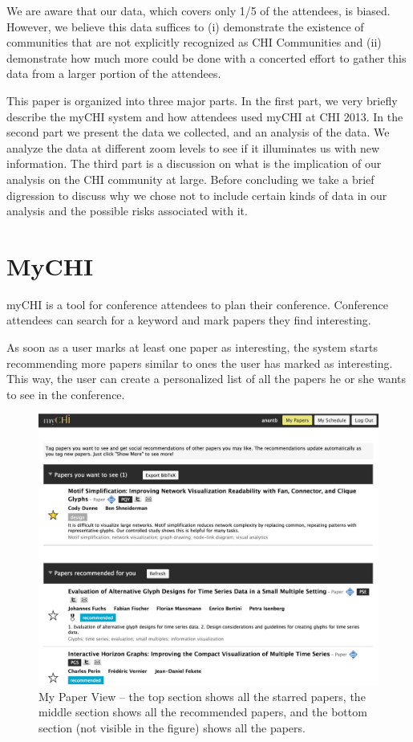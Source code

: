 \documentclass{sigchi}
\begin{document}
We are aware that our data, which covers only 1/5 of the attendees, is biased.  However, we believe this data suffices to (i) demonstrate the existence of communities that are not explicitly recognized as CHI Communities and (ii) demonstrate how much more could be done with a concerted effort to gather this data from a larger portion of the attendees.

This paper is organized into three major parts. In the first part, we very briefly describe the myCHI system and how attendees used myCHI at CHI 2013. In the second part we present the data we collected, and an analysis of the data. We analyze the data at different zoom levels to see if it illuminates us with new information. The third part is a discussion on what is the implication of our analysis on the CHI community at large. Before concluding we take a brief digression to discuss why we chose not to include certain kinds of data in our analysis and the possible risks associated with it.


\section{MyCHI}
myCHI is a tool for conference attendees to plan their conference. Conference attendees can search for a keyword and mark papers they find interesting. 

As soon as a user marks at least one paper as interesting, the system starts recommending more papers similar to ones the user has marked as interesting. This way, the user can create a personalized list of all the papers he or she wants to see in the conference. 
 

\begin{figure}[!h]
\centering
\includegraphics[width=0.9\columnwidth]{mychi-papers-view-recommendations}
\caption{My Paper View -- the top section shows all the starred papers, the middle section shows all the recommended papers, and the bottom section (not visible in the figure) shows all the papers.}
\label{fig:MyCHI -- My Papers}
\end{figure}
\end{document}
